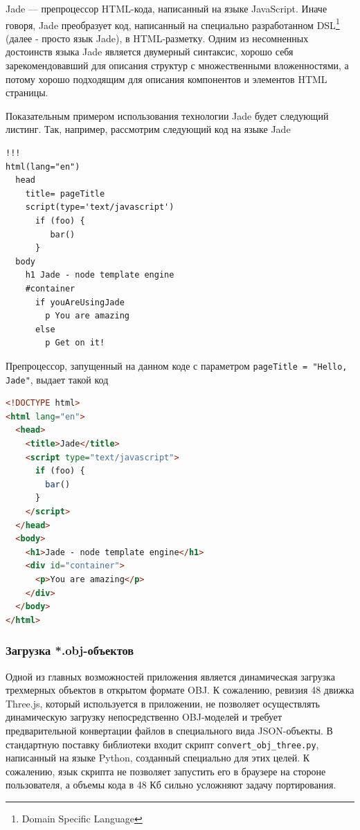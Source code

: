 \documentclass[12pt, a4paper]{article}
\begin{document}
Jade --- препроцессор HTML-кода, написанный на языке JavaScript. Иначе говоря,
Jade преобразует код, написанный на специально разработанном DSL\footnote{Domain
Specific Language} (далее - просто язык Jade), в HTML-разметку. Одним из
несомненных достоинств языка Jade является двумерный синтаксис, хорошо себя
зарекомендовавший для описания структур с множественными вложенностями, а потому
хорошо подходящим для описания компонентов и элементов HTML страницы.

Показательным примером использования технологии Jade будет следующий листинг.
Так, например, рассмотрим следующий код на языке Jade
\begin{lstlisting}
!!!
html(lang="en")
  head
    title= pageTitle
    script(type='text/javascript')
      if (foo) {
         bar()
      }
  body
    h1 Jade - node template engine
    #container
      if youAreUsingJade
        p You are amazing
      else
        p Get on it!
\end{lstlisting}

Препроцессор, запущенный на данном коде с параметром \texttt{pageTitle = "Hello,
Jade"}, выдает такой код

\begin{lstlisting}[language=html]
<!DOCTYPE html>
<html lang="en">
  <head>
    <title>Jade</title>
    <script type="text/javascript">
      if (foo) {
        bar()
      }
    </script>
  </head>
  <body>
    <h1>Jade - node template engine</h1>
    <div id="container">
      <p>You are amazing</p>
    </div>
  </body>
</html>
\end{lstlisting}

\subsubsection{Загрузка *.obj-объектов}
Одной из главных возможностей приложения является динамическая загрузка
трехмерных объектов в открытом формате OBJ. К сожалению, ревизия 48 движка
Three.js, который используется в приложении, не позволяет осуществлять
динамическую загрузку непосредственно OBJ-моделей и требует предварительной
конвертации файлов в специального вида JSON-объекты. В стандартную поставку
библиотеки входит скрипт \texttt{convert\_obj\_three.py}, написанный на языке
Python, созданный специально для этих целей. К сожалению, язык
скрипта не позволяет запустить его в браузере на стороне пользователя, а объемы кода в 48 Кб сильно
усложняют задачу портирования.
\end{document}
